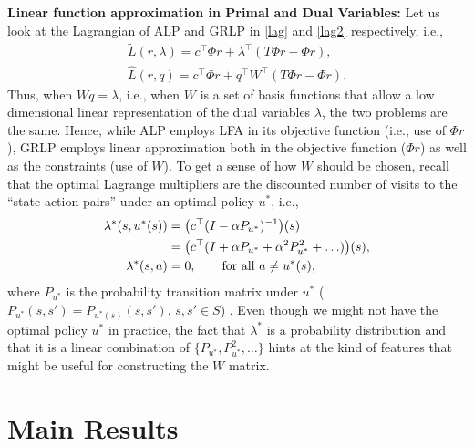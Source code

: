 \documentclass[twocolumn]{IEEEtran}
\begin{document}
\textbf{Linear function approximation in Primal and Dual Variables:} Let us look at the Lagrangian of ALP and GRLP in
\eqref{lag} and \eqref{lag2} respectively, i.e.,
\begin{align}\label{lag}
\tilde{L}(r,\lambda)=c^\top \Phi r+\lambda^\top (T\Phi r-\Phi r), \\ \label{lag2}\hat{L}(r,q)=c^\top \Phi r+q^\top W^\top (T\Phi r-\Phi r).
\end{align}
Thus, when $Wq = \lambda$, i.e., when $W$ is a set of basis functions that allow
a low dimensional linear representation of the dual variables $\lambda$,
the two problems are the same.
Hence, while ALP employs LFA in its objective function (i.e., use of $\Phi r$), GRLP employs linear approximation both in the objective function ($\Phi r$) as well as the constraints (use of $W$).
To get a sense of how $W$ should be chosen, recall that
the optimal Lagrange multipliers are the discounted number of visits to the ``state-action pairs'' under an optimal policy $u^*$, i.e.,
\begin{align}
\lambda^*(s,u^*(s))&=\big(c^\top(I-\alpha P_{u^*})^{-1}\big)(s)\nonumber\\
&= \big(c^\top(I+\alpha P_{u^*}+\alpha^2 P_{u^*}^2+\ldots)\big)(s),\nonumber\\
\lambda^*(s,a)&=0, \qquad \text{for all } a \neq u^*(s),\nonumber
\end{align}
where $P_{u^*}$ is the probability transition matrix under $u^*$ ($P_{u^*}(s,s') = P_{u^*(s)}(s,s')$, $s,s'\in S$) \cite{dolgov}. Even though we might not have the optimal policy $u^*$ in practice, the fact that $\lambda^*$ is a probability distribution and that it is a linear combination of $\{P_{u^*},P^2_{u^*},\ldots\}$ hints at the kind of features that might be useful for constructing the $W$ matrix.
\fi

\section{Main Results}\label{mainresults}
\end{document}
